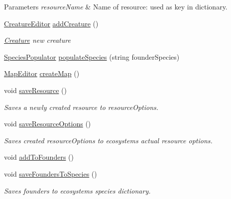 \begin{DoxyCompactItemize}
\begin{DoxyCompactList}\small\item\em 
\begin{DoxyParams}{Parameters}
{\em resource\+Name} & Name of resource\+: used as key in dictionary.\\
\hline
\end{DoxyParams}
\end{DoxyCompactList}\item 
\mbox{\hyperlink{class_creature_editor}{Creature\+Editor}} \mbox{\hyperlink{class_ecosystem_editor_a818800b8e8a812dd061e85a8f2a483b7}{add\+Creature}} ()
\begin{DoxyCompactList}\small\item\em \mbox{\hyperlink{class_creature}{Creature}} new creature \end{DoxyCompactList}\item 
\mbox{\hyperlink{class_species_populator}{Species\+Populator}} \mbox{\hyperlink{class_ecosystem_editor_a3f0623c56b5399b02f6b18a72652a1ba}{populate\+Species}} (string founder\+Species)
\item 
\mbox{\hyperlink{class_map_editor}{Map\+Editor}} \mbox{\hyperlink{class_ecosystem_editor_a34ac5bdf72932adfbdf5758a8f42a836}{create\+Map}} ()
\item 
void \mbox{\hyperlink{class_ecosystem_editor_a1d369adb1216181a3db5cdde1baf50af}{save\+Resource}} ()
\begin{DoxyCompactList}\small\item\em Saves a newly created resource to resource\+Options. \end{DoxyCompactList}\item 
void \mbox{\hyperlink{class_ecosystem_editor_af57a50510d4baf7cc372fc2b32c38ead}{save\+Resource\+Options}} ()
\begin{DoxyCompactList}\small\item\em Saves created resource\+Options to ecosystems actual resource options. \end{DoxyCompactList}\item 
void \mbox{\hyperlink{class_ecosystem_editor_a22b8b780750a21d6b893e417f623ba30}{add\+To\+Founders}} ()
\item 
void \mbox{\hyperlink{class_ecosystem_editor_a5aa46063ae1157099b036e81cdcbe2ad}{save\+Founders\+To\+Species}} ()
\begin{DoxyCompactList}\small\item\em Saves founders to ecosystem\textquotesingle{}s species dictionary. \end{DoxyCompactList}\item 

\end{DoxyCompactItemize}
